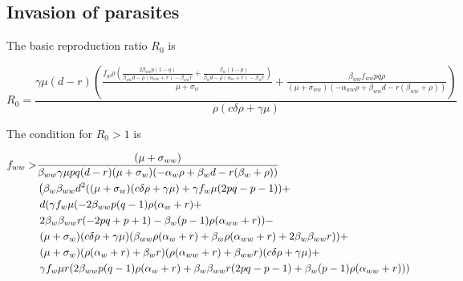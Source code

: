 \documentclass[11pt]{article}
\begin{document}
\subsection*{Invasion of parasites}

The basic reproduction ratio $R_0$ is

\begin{equation}
	R_0 = \frac{\gamma  \mu  (d-r) \left(\frac{f_w \rho  \left(\frac{2 \beta_{ww} p (1-q)}{\beta_{ww} d - \rho  (\alpha_{ww}+r) - \beta_{ww} r} + \frac{\beta_w(1 - p)}{\beta_w d - \rho  (\alpha_w + r) -\beta_w r}\right)}{\mu +\sigma_w}+\frac{\beta_{ww}f_{ww} p q \rho }{(\mu +\sigma_{ww}) (-\alpha_{ww} \rho +\beta_{ww} d-r (\beta_{ww}+\rho ))}\right)}{\rho  (c \delta  \rho +\gamma  \mu )}
\end{equation}

The condition for $R_0 > 1$ is

\begin{align}
	f_{ww} > & \frac{(\mu +\sigma_{ww})}{\beta_{ww} \gamma  \mu  p q (d-r) (\mu +\sigma_w) (-\alpha_w \rho +\beta_wd-r (\beta_w+\rho ))} \notag \\
	& \left(\beta_w \beta_{ww} d^2 ((\mu +\sigma_w) (c \delta  \rho +\gamma  \mu )+\gamma f_w \mu  (2 p q-p-1)) + \right. \notag \\
	& \left. d (\gamma f_w \mu  (-2 \beta_{ww} p (q-1) \rho  (\alpha_w + r) + \right. \notag \\
	& \left. 2 \beta_w \beta_{ww} r (-2 p q+p+1)-\beta_w(p-1) \rho  (\alpha_{ww}+r)) - \right. \notag \\
	& \left. (\mu +\sigma_w) (c \delta  \rho +\gamma  \mu ) (\beta_{ww} \rho  (\alpha_w + r) + \beta_w \rho  (\alpha_{ww}+r) + 2 \beta_w\beta_{ww} r)) + \right. \notag \\
	& \left. (\mu +\sigma_w) (\rho  (\alpha_w + r)+\beta_w r) (\rho  (\alpha_{ww}+r) + \beta_{ww} r) (c \delta  \rho +\gamma  \mu ) + \right. \notag \\
	& \left. \gamma f_w \mu  r (2 \beta_{ww} p (q-1) \rho  (\alpha_w + r)+ \beta_w\beta_{ww} r (2 p q-p-1)+\beta_w(p-1) \rho  (\alpha_{ww}+r)) \right)
\end{align}
\end{document}
